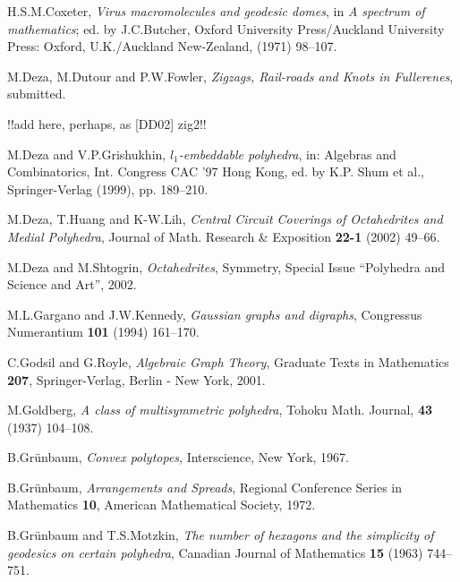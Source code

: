 \documentclass[12pt]{article}
\begin{document}
\begin{thebibliography}{99}



H.S.M.Coxeter, {\em Virus macromolecules and geodesic domes}, in {\em A spectrum of mathematics}; ed. by J.C.Butcher, Oxford University Press/Auckland University Press: Oxford, U.K./Auckland New-Zealand, (1971) 98--107.


M.Deza, M.Dutour and P.W.Fowler,
{\em Zigzags, Rail-roads and Knots in Fullerenes},
submitted.

!!add here, perhaps, as [DD02] zig2!!

M.Deza and V.P.Grishukhin,
{\em $l_1$-embeddable polyhedra},
in: Algebras and Combinatorics, Int. Congress CAC '97 Hong Kong,
ed. by K.P. Shum et al., Springer-Verlag (1999), pp. 189--210.


M.Deza, T.Huang and K-W.Lih,
{\em Central Circuit Coverings of Octahedrites and Medial Polyhedra},
Journal of Math. Research \& Exposition {\bf 22-1} (2002) 49--66.


M.Deza and M.Shtogrin,
{\em Octahedrites}, 
Symmetry, Special Issue ``Polyhedra and Science and Art'', 2002.


M.L.Gargano and J.W.Kennedy,
{\em Gaussian graphs and digraphs}, Congressus Numerantium {\bf 101}
(1994) 161--170.


C.Godsil and G.Royle, {\em Algebraic Graph Theory}, Graduate Texts in 
Mathematics {\bf 207}, Springer-Verlag, Berlin - New York, 2001.


M.Goldberg, {\em A class of multisymmetric polyhedra}, Tohoku Math.
Journal, {\bf 43} (1937) 104--108.


B.Gr\"{u}nbaum, {\em Convex polytopes}, Interscience, New York, 1967.


B.Gr\"{u}nbaum, {\em Arrangements and Spreads}, Regional Conference Series in
Mathematics {\bf 10}, American Mathematical Society, 1972.


B.Gr\"{u}nbaum and T.S.Motzkin, {\em The number of hexagons and the simplicity
of geodesics on certain polyhedra}, Canadian Journal of Mathematics {\bf 15} (1963) 744--751.



\end{thebibliography}
\end{document}
